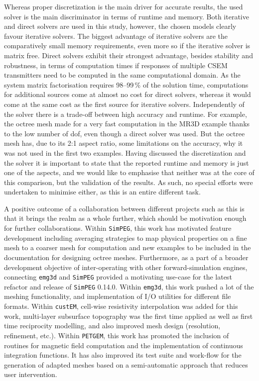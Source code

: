 \documentclass[extra, camera,%
]{gji}
\newcommand{\emg}[2]{\texttt{emg#1#2}\xspace}
\newcommand{\simpeg}{\texttt{SimPEG}\xspace}
\newcommand{\custem}{\texttt{custEM}\xspace}
\newcommand{\petgem}{\texttt{PETGEM}\xspace}
\begin{document}
Whereas proper discretization is the main driver for accurate results, the used solver is the main discriminator in terms of runtime and memory. Both iterative and direct solvers are used in this study, however, the chosen models clearly favour iterative solvers. The biggest advantage of iterative solvers are the comparatively small memory requirements, even more so if the iterative solver is matrix free. Direct solvers exhibit their strongest advantage, besides stability and robustness, in terms of computation times if responses of multiple CSEM transmitters need to be computed in the same computational domain. As the system matrix factorisation requires 98--99\,\% of the solution time, computations for additional sources come at almost no cost for direct solvers, whereas it would come at the same cost as the first source for iterative solvers. Independently of the solver there is a trade-off between high accuracy and runtime. For example, the octree mesh made for a very fast computation in the MR3D example thanks to the low number of dof, even though a direct solver was used. But the octree mesh has, due to its 2:1 aspect ratio, some limitations on the accuracy, why it was not used in the first two examples. Having discussed the discretization and the solver it is important to state that the reported runtime and memory is just one of the aspects, and we would like to emphasise that neither was at the core of this comparison, but the validation of the results. As such, no special efforts were undertaken to minimise either, as this is an entire different task.

A positive outcome of a collaboration between different projects such as this is that it brings the realm as a whole further, which should be motivation enough for further collaborations. Within \simpeg, this work has motivated feature development including averaging strategies to map physical properties on a fine mesh to a coarser mesh for computation and new examples to be included in the documentation for designing octree meshes. Furthermore, as a part of a broader development objective of inter-operating with other forward-simulation engines, connecting \emg3d and \simpeg provided a motivating use-case for the latest refactor and release of \simpeg 0.14.0. Within \emg3d, this work pushed a lot of the meshing functionality, and implementation of I/O utilities for different file formats. Within \custem, cell-wise resistivity interpolation was added for this work, multi-layer subsurface topography was the first time applied as well as first time reciprocity modelling, and also improved mesh design (resolution, refinement, etc.). Within \petgem, this work has promoted the inclusion of routines for magnetic field computation and the implementation of continuous integration functions. It has also improved its test suite and work-flow for the generation of adapted meshes based on a semi-automatic approach that reduces user intervention.
\end{document}
